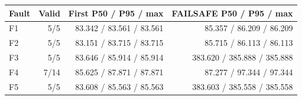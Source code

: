 \begin{tabular}{@{}lrrr@{}}\toprule Fault & Valid & First P50 / P95 / max & FAILSAFE P50 / P95 / max\\\midrule
F1 & 5/5 & 83.342 / 83.561 / 83.561 & 85.357 / 86.209 / 86.209\\[5pt]
F2 & 5/5 & 83.151 / 83.715 / 83.715 & 85.715 / 86.113 / 86.113\\[5pt]
F3 & 5/5 & 83.646 / 85.914 / 85.914 & 383.620 / 385.888 / 385.888\\[5pt]
F4 & 7/14 & 85.625 / 87.871 / 87.871 & 87.277 / 97.344 / 97.344\\[5pt]
F5 & 5/5 & 83.608 / 85.563 / 85.563 & 383.603 / 385.558 / 385.558\\[5pt]
\bottomrule\end{tabular}
